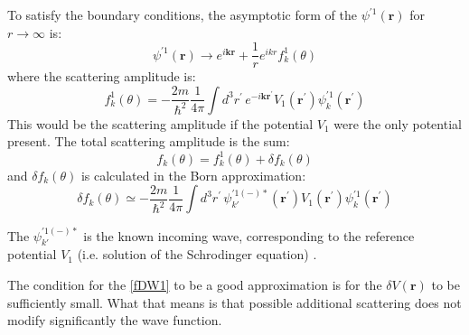 To satisfy the boundary conditions, the asymptotic form of the $ \psi^{'1}(\mathbf{r}) $ for $ r \rightarrow \infty$  is:
\begin{equation}
\psi^{'1}(\mathbf{r}) \rightarrow e^{i\mathbf{k}\mathbf{r}} + \frac{1}{r} e^{ikr}f^1_k(\theta)
\end{equation}
where the scattering amplitude is:
\begin{equation}
f^1_k(\theta) = -\frac{2m}{\hbar^2}\frac{1}{4\pi}\int{d^3r^{'}\,e^{-i\mathbf{k}\mathbf{r}^{'}}V_1(\mathbf{r}^{'})\psi^{'1}_k(\mathbf{r}^{'})}
\end{equation}
This would be the scattering amplitude if the potential $ V_1 $ were the only potential present. The total scattering amplitude is the sum:
\begin{equation}
f_k(\theta) = f^1_k(\theta) + \delta f_k(\theta)
\end{equation}
and $ \delta f_k(\theta) $ is calculated in the Born approximation:
\begin{equation}\label{fDW1}
\delta f_k(\theta) \simeq -\frac{2m}{\hbar^2}\frac{1}{4\pi}\int{d^3r^{'}\,\psi^{'1(-)*}_{k'}(\mathbf{r}^{'})V_1(\mathbf{r}^{'})\psi^{'1}_k(\mathbf{r}^{'})}
\end{equation}

The $ \psi^{'1(-)*}_{k'} $ is the known incoming wave, corresponding to the reference potential $ V_1 $ (i.e. solution of the Schrodinger equation) .

The condition for the \eqref{fDW1} to be a good approximation is for the $ \delta V(\mathbf{r}) $ to be sufficiently small. What that means is that possible additional scattering does not modify significantly the wave function.

